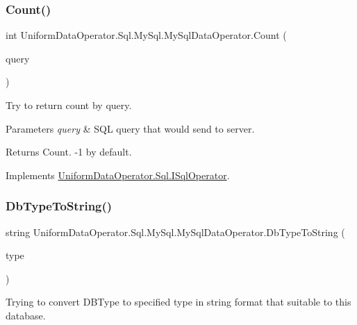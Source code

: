 \subsubsection{\texorpdfstring{Count()}{Count()}}
{\footnotesize\ttfamily int Uniform\+Data\+Operator.\+Sql.\+My\+Sql.\+My\+Sql\+Data\+Operator.\+Count (\begin{DoxyParamCaption}\item[{string}]{query }\end{DoxyParamCaption})}



Try to return count by query. 


\begin{DoxyParams}{Parameters}
{\em query} & S\+QL query that would send to server.\\
\hline
\end{DoxyParams}
\begin{DoxyReturn}{Returns}
Count. -\/1 by default.
\end{DoxyReturn}


Implements \mbox{\hyperlink{interface_uniform_data_operator_1_1_sql_1_1_i_sql_operator_ad53cec492d507ed154f5535ce1db4e42}{Uniform\+Data\+Operator.\+Sql.\+I\+Sql\+Operator}}.

\mbox{\label{class_uniform_data_operator_1_1_sql_1_1_my_sql_1_1_my_sql_data_operator_a7b854ebbcdf31c67716d8c365c321a31}} 
\subsubsection{\texorpdfstring{Db\+Type\+To\+String()}{DbTypeToString()}}
{\footnotesize\ttfamily string Uniform\+Data\+Operator.\+Sql.\+My\+Sql.\+My\+Sql\+Data\+Operator.\+Db\+Type\+To\+String (\begin{DoxyParamCaption}\item[{Db\+Type}]{type }\end{DoxyParamCaption})}



Trying to convert D\+B\+Type to specified type in string format that suitable to this database. 


